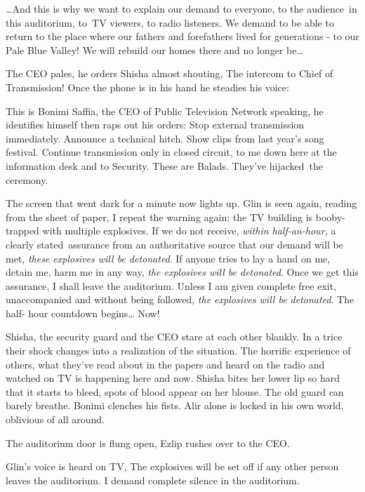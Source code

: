 \documentclass[letterpaper]{article}
\begin{document}
{\textquotedbl}{\dots}And this is why we want to explain our demand to everyone, to the audience~in this auditorium,
to~TV viewers, to radio listeners. We demand to be able to return to the place where our fathers and forefathers lived
for generations - to our Pale Blue Valley! We will rebuild our homes there and no longer be{\dots}{\textquotedbl}

The CEO pales, he orders Shisha almost shouting, {\textquotedbl}The intercom to Chief of Transmission!{\textquotedbl}
Once the phone is in his hand he steadies his voice:

{\textquotedbl}This is Bonimi Saffia, the CEO of Public Television Network speaking,{\textquotedbl} he identifies
himself then raps out his orders: {\textquotedbl}Stop external transmission immediately. Announce a technical hitch.
Show clips from last year's song festival. Continue transmission only in closed circuit, to me down here at the
information desk and to Security. These are Balads. They've hijacked~the ceremony.{\textquotedbl}~~~~~~ 

The screen that went dark for a minute now lights up. Glin is seen again, reading from the sheet of paper,
{\textquotedbl}I repeat the warning again: the TV building is booby-trapped with multiple explosives. If we do not
receive, \textit{within half-an-hour,} a clearly stated~assurance from an authoritative source that our demand will be
met, \textit{these explosives will be detonated}. If anyone tries to lay a hand on me, detain me, harm me in any way,
\textit{the explosives will be detonated}. Once we get this assurance, I shall leave the auditorium. Unless I am given
complete free exit, unaccompanied and without{ }being followed, \textit{the
explosives will be detonated}. The half- hour countdown begins{\dots} Now!{\textquotedbl}

Shisha, the security guard and the CEO stare at each other{ }blankly. In a trice
their shock changes into a realization of the situation. The horrific experience of others, what they've read about in
the papers and heard on the radio and watched on TV is happening here and now. Shisha bites her lower lip so hard that
it starts to bleed, spots of blood appear{ }on her blouse. The old guard can
barely breathe. Bonimi clenches his fists. Alir alone is locked in his own world, oblivious of all around. 

The auditorium door is flung open, Ezlip rushes over to the CEO.

Glin's voice is heard on TV, {\textquotedbl}The explosives will be set off if any other person leaves the auditorium. I
demand complete silence in the auditorium.{\textquotedbl}
\end{document}
